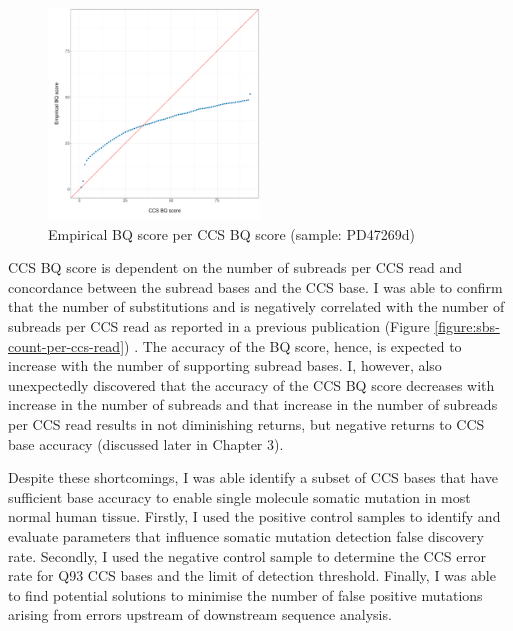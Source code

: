 \begin{figure}[htbp!]
\caption{Empirical BQ score per CCS BQ score (sample: PD47269d)}
\label{figure:empirical-bq-per-bq}
\begin{centering}
\includegraphics[width=0.5\textwidth]{Vector/empirical_bq_per_bq.pdf}
\end{centering}
\end{figure}

CCS BQ score is dependent on the number of subreads per CCS read and concordance between the subread bases and the CCS base. I was able to confirm that the number of substitutions and is negatively correlated with the number of subreads per CCS read as reported in a previous publication (Figure \ref{figure:sbs-count-per-ccs-read}) \cite{Wenger2019-pw}. The accuracy of the BQ score, hence, is expected to increase with the number of supporting subread bases. I, however, also unexpectedly discovered that the accuracy of the CCS BQ score decreases with increase in the number of subreads and that increase in the number of subreads per CCS read results in not diminishing returns, but negative returns to CCS base accuracy (discussed later in Chapter 3). 

Despite these shortcomings, I was able identify a subset of CCS bases that have sufficient base accuracy to enable single molecule somatic mutation in most normal human tissue. Firstly, I used the positive control samples to identify and evaluate parameters that influence somatic mutation detection false discovery rate. Secondly, I used the negative control sample to determine the CCS error rate for Q93 CCS bases and the limit of detection threshold. Finally, I was able to find potential solutions to minimise the number of false positive mutations arising from errors upstream of downstream sequence analysis. 

